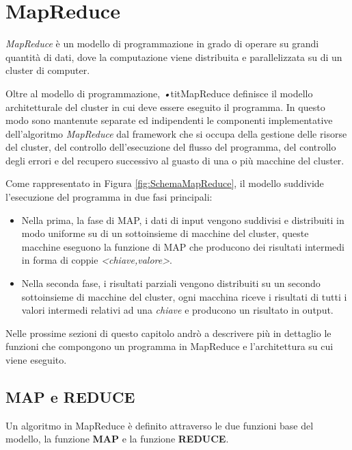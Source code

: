 \documentclass[LaM,binding=0.6cm]{sapthesis}
\begin{document}
\chapter{MapReduce}

\textit{MapReduce} \cite{Dean:2008:MSD:1327452.1327492} è un modello di  programmazione in grado di operare su grandi quantità di dati, dove la computazione viene distribuita e parallelizzata su di un cluster di computer.

Oltre al modello di programmazione, \textit{•}tit{MapReduce} definisce il modello architetturale del cluster in cui deve essere eseguito il programma. In questo modo sono mantenute separate ed indipendenti le componenti implementative dell'algoritmo \textit{MapReduce} dal framework che si occupa della gestione delle risorse del cluster, del controllo dell'esecuzione del flusso del programma, del controllo degli errori e del recupero successivo al guasto di una o più macchine del cluster.


Come rappresentato in Figura \ref{fig:SchemaMapReduce}, il modello suddivide l'esecuzione del programma in due fasi principali: 
	\begin{itemize}
	\item Nella prima, la fase di MAP, i dati di input vengono suddivisi e distribuiti in modo uniforme su di un sottoinsieme di  macchine del cluster, queste macchine eseguono la funzione di MAP che producono dei risultati intermedi in forma di coppie \textit{<chiave,valore>}.
	\item Nella seconda fase, i risultati parziali vengono distribuiti su un secondo sottoinsieme di macchine del cluster, ogni macchina riceve i risultati di tutti i valori intermedi relativi ad una \textit{chiave} e producono un risultato in output.
	\end{itemize}
	
Nelle prossime sezioni di questo capitolo andrò a descrivere più in dettaglio le funzioni che compongono un programma in MapReduce e l'architettura su cui viene eseguito. 

\section{MAP e REDUCE}

Un algoritmo in MapReduce \cite{Dean:2008:MSD:1327452.1327492} è definito attraverso le due funzioni base del modello, la funzione \textbf{MAP} e la funzione \textbf{REDUCE}. 
\end{document}
